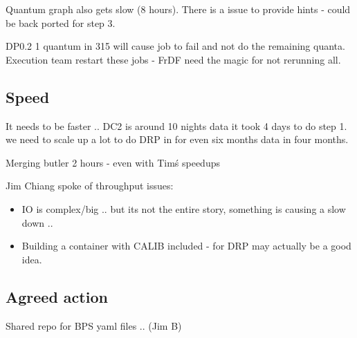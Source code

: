 Quantum graph also gets slow (8 hours).
There is a issue to provide hints - could be back ported for step 3.

DP0.2 1 quantum in 315 will cause job to fail and not do the remaining quanta.
Execution team restart these jobs - FrDF need the magic for not rerunning all.

\subsection {Speed}
It needs to be faster .. DC2 is around 10 nights data  it took 4 days to do step 1.
we need to scale up a lot to do DRP in for even six months data in four months.

Merging butler 2 hours - even with Tim\'s speedups

Jim Chiang spoke of throughput issues:
\begin{itemize}
\item IO is complex/big .. but its not the entire story, something is causing a slow down ..
\item Building a container with CALIB included - for DRP may actually be a good idea.
\end{itemize}

\subsection {Agreed action }

Shared repo for BPS yaml files ..  (Jim B)

